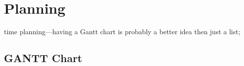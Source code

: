 \chapter{Planning}
\label{chap:planning}

time planning—having a Gantt chart is probably a better idea then just a list;

\section{GANTT Chart}